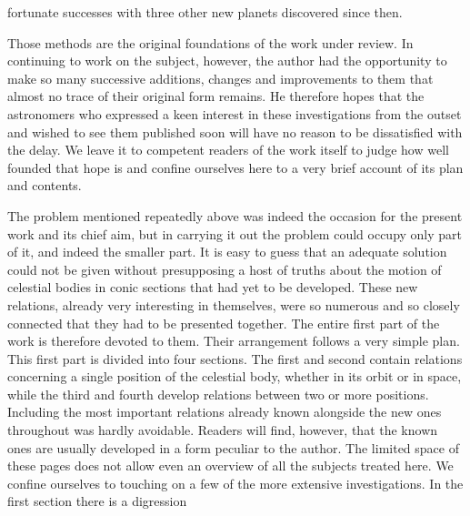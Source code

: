 fortunate successes with three other new planets discovered since then.

Those methods are the original foundations of the work under review. In continuing to work on the subject, however, the author had the opportunity to make so many successive additions, changes and improvements to them that almost no trace of their original form remains. He therefore hopes that the astronomers who expressed a keen interest in these investigations from the outset and wished to see them published soon will have no reason to be dissatisfied with the delay. We leave it to competent readers of the work itself to judge how well founded that hope is and confine ourselves here to a very brief account of its plan and contents.

The problem mentioned repeatedly above was indeed the occasion for the present work and its chief aim, but in carrying it out the problem could occupy only part of it, and indeed the smaller part. It is easy to guess that an adequate solution could not be given without presupposing a host of truths about the motion of celestial bodies in conic sections that had yet to be developed. These new relations, already very interesting in themselves, were so numerous and so closely connected that they had to be presented together. The entire first part of the work is therefore devoted to them. Their arrangement follows a very simple plan. This first part is divided into four sections. The first and second contain relations concerning a single position of the celestial body, whether in its orbit or in space, while the third and fourth develop relations between two or more positions. Including the most important relations already known alongside the new ones throughout was hardly avoidable. Readers will find, however, that the known ones are usually developed in a form peculiar to the author. The limited space of these pages does not allow even an overview of all the subjects treated here. We confine ourselves to touching on a few of the more extensive investigations. In the first section there is a digression
